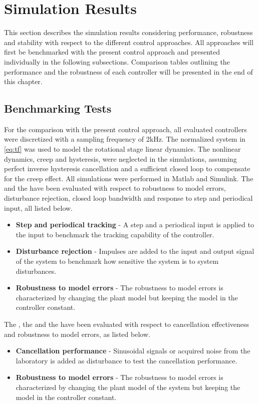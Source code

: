 \chapter{Simulation Results}\label{cha:result}
This section describes the simulation results considering performance, robustness and stability with respect to the different control approaches. All approaches will first be benchmarked with the present control approach and presented individually in the following subsections. Comparison tables outlining the performance and the robustness of each controller will be presented in the end of this chapter.

\section{Benchmarking Tests}
For the comparison with the present control approach, all evaluated controllers were discretized with a sampling frequency of 2kHz. The normalized system in \eqref{eq:tf} was used to model the rotational stage linear dynamics. The nonlinear dynamics, creep and hysteresis, were neglected in the simulations, assuming perfect inverse hysteresis cancellation and a sufficient closed loop to compensate for the creep effect. All simulations were performed in Matlab and Simulink. The \abbrMRACPE and the \abbrIRC have been evaluated with respect to robustness to model errors, disturbance rejection, closed loop bandwidth and response to step and periodical input, all listed below.

\begin{itemize}
\item {\bf Step and periodical tracking} - A step and a periodical input is applied to the input to benchmark the tracking capability of the controller.
\item {\bf Disturbance rejection} - Impulses are added to the input and output signal of the system to benchmark how sensitive the system is to system disturbances.
\item {\bf Robustness to model errors} - The robustness to model errors is characterized by changing the plant model but keeping the model in the controller constant.
\end{itemize}

The \abbrIMP, the \abbrFDC and the \abbrRFDC have been evaluated with respect to cancellation effectiveness and robustness to model errors, as listed below.

\begin{itemize}
\item {\bf Cancellation performance} -  Sinusoidal signals or acquired noise from the laboratory is added as disturbance to test the cancellation performance.
\item {\bf Robustness to model errors} - The robustness to model errors is characterized by changing the plant model of the system but keeping the model in the controller constant.
\end{itemize}

